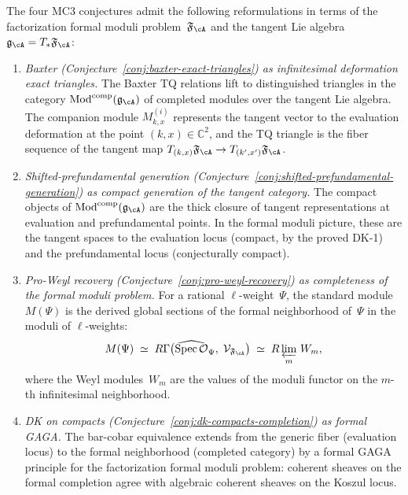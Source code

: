 \begin{conjecture}
\label{conj:mc3-formal-moduli-reformulation}
The four MC3 conjectures admit the following reformulations in terms
of the factorization formal moduli problem~$\mathfrak{F}_{\cA}$
and the tangent Lie algebra
$\mathfrak{g}_{\cA} = T_{*}\mathfrak{F}_{\cA}$:
\begin{enumerate}[label=\textup{(\Roman*)}]
\item \emph{Baxter
  \textup{(}Conjecture~\textup{\ref{conj:baxter-exact-triangles}}\textup{)}
  as infinitesimal deformation exact triangles.}
  The Baxter TQ relations lift to distinguished triangles in
  the category $\operatorname{Mod}^{\mathrm{comp}}(\mathfrak{g}_{\cA})$
  of completed modules over the tangent Lie algebra.  The
  companion module $M_{k,x}^{(i)}$ represents the tangent
  vector to the evaluation deformation at the point
  $(k, x) \in \mathbb{C}^2$, and the TQ triangle is the
  fiber sequence of the tangent map
  $T_{(k,x)}\mathfrak{F}_{\cA} \to
  T_{(k',x')}\mathfrak{F}_{\cA}$.

\item \emph{Shifted-prefundamental generation
  \textup{(}Conjecture~\textup{\ref{conj:shifted-prefundamental-generation}}\textup{)}
  as compact generation of the tangent category.}
  The compact objects of
  $\operatorname{Mod}^{\mathrm{comp}}(\mathfrak{g}_{\cA})$
  are the thick closure of tangent representations at
  evaluation and prefundamental points.  In the formal moduli
  picture, these are the tangent spaces to the evaluation
  locus (compact, by the proved DK-1) and the
  prefundamental locus (conjecturally compact).

\item \emph{Pro-Weyl recovery
  \textup{(}Conjecture~\textup{\ref{conj:pro-weyl-recovery}}\textup{)}
  as completeness of the formal moduli problem.}
  For a rational $\ell$-weight~$\Psi$, the standard module
  $M(\Psi)$ is the derived global sections of the formal
  neighborhood of~$\Psi$ in the moduli of $\ell$-weights:
  \[
  M(\Psi)
  \;\simeq\;
  R\Gamma\bigl(\widehat{\mathrm{Spec}\,
  \mathcal{O}}_\Psi,\;
  \mathcal{V}_{\mathfrak{F}_{\cA}}\bigr)
  \;\simeq\;
  R\varprojlim_m\, W_m,
  \]
  where the Weyl modules~$W_m$ are the values of the moduli
  functor on the $m$-th infinitesimal neighborhood.

\item \emph{DK on compacts
  \textup{(}Conjecture~\textup{\ref{conj:dk-compacts-completion}}\textup{)}
  as formal GAGA.}
  The bar-cobar equivalence extends from the generic
  fiber (evaluation locus) to the formal neighborhood
  (completed category) by a formal GAGA principle for
  the factorization formal moduli problem:
  coherent sheaves on the formal completion agree with
  algebraic coherent sheaves on the Koszul locus.
\end{enumerate}
\end{conjecture}


